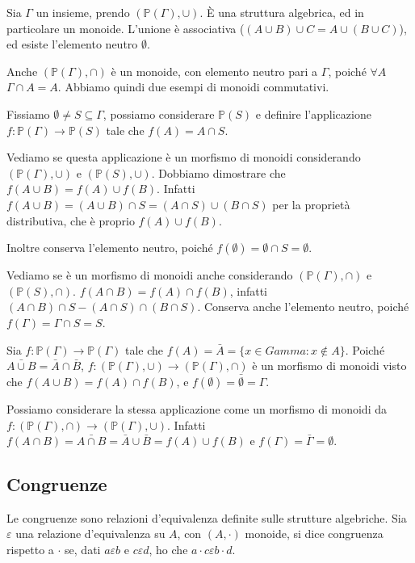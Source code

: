 Sia $\Gamma$ un insieme, prendo $(\mathbb{P}(\Gamma), \cup)$. \`E una struttura algebrica, ed in particolare un monoide. L'unione \`e associativa ($(A \cup B) \cup C = A \cup (B \cup C)$), ed esiste l'elemento neutro $\emptyset$.

Anche $(\mathbb{P}(\Gamma), \cap)$ \`e un monoide, con elemento neutro pari a $\Gamma$, poich\'e $\forall A$ $\Gamma \cap A = A$. Abbiamo quindi due esempi di monoidi commutativi.

Fissiamo $\emptyset \neq S \subseteq \Gamma$, possiamo considerare $\mathbb{P}(S)$ e definire l'applicazione $f : \mathbb{P}(\Gamma) \to \mathbb{P}(S)$ tale che $f(A) = A \cap S$. 

Vediamo se questa applicazione \`e un morfismo di monoidi considerando $(\mathbb{P}(\Gamma), \cup)$ e $(\mathbb{P}(S), \cup)$. Dobbiamo dimostrare che $f( A \cup B) = f(A) \cup f(B)$. Infatti $f(A \cup B) = (A \cup B) \cap S = (A \cap S) \cup (B \cap S)$ per la propriet\`a distributiva, che \`e proprio $f(A) \cup f(B)$.

Inoltre conserva l'elemento neutro, poich\'e $f(\emptyset) = \emptyset \cap S = \emptyset$.

Vediamo se \`e un morfismo di monoidi anche considerando $(\mathbb{P}(\Gamma), \cap)$ e $(\mathbb{P}(S), \cap)$. $f(A \cap B) = f(A) \cap f(B)$, infatti $(A \cap B) \cap S - (A \cap S) \cap (B \cap S)$. Conserva anche l'elemento neutro, poich\'e $f(\Gamma) = \Gamma \cap S = S$.

Sia $f : \mathbb{P}(\Gamma) \to \mathbb{P}(\Gamma)$ tale che $f(A) = \bar A = \{ x \in Gamma : x \notin A\}$. Poich\'e $\bar{A \cup B} = \bar A \cap \bar B$, $f : (\mathbb{P}(\Gamma), \cup) \to (\mathbb{P}(\Gamma), \cap)$ \`e un morfismo di monoidi visto che $f(A \cup B) = f(A) \cap f(B)$, e $f(\emptyset) = \bar \emptyset = \Gamma$. 

Possiamo considerare la stessa applicazione come un morfismo di monoidi da $f : (\mathbb{P}(\Gamma), \cap) \to (\mathbb{P}(\Gamma), \cup)$. Infatti $f(A \cap B) = \bar{A \cap B} = \bar A \cup \bar B = f(A) \cup f(B)$ e $f(\Gamma) = \bar \Gamma = \emptyset$.

\subsection{Congruenze}

Le congruenze sono relazioni d'equivalenza definite sulle strutture algebriche. Sia $\varepsilon$ una relazione d'equivalenza su $A$, con $(A, \cdot)$ monoide, si dice congruenza rispetto a $\cdot$ se, dati $a \varepsilon b$ e $c \varepsilon d$, ho che $a \cdot c \varepsilon b \cdot d$.

